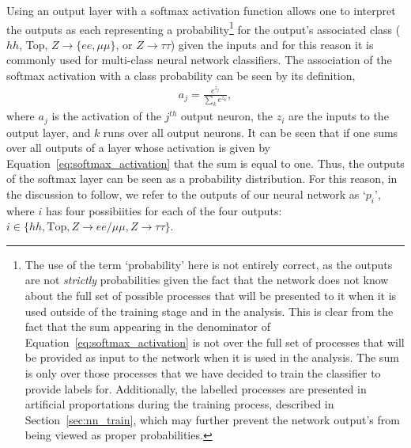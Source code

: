 Using an output layer with a softmax activation function allows one to interpret the outputs as
each representing a probability\footnote{
The use of the term `probability' here is not entirely correct, as the outputs are not \textit{strictly} probabilities given the fact that the network
does not know about the full set of possible processes that will be presented to it when it is used outside
of the training stage and in the analysis.
This is clear from the fact that the sum appearing in the denominator of Equation~\ref{eq:softmax_activation}
is not over the full set of processes that will be provided as input to the network when it is used
in the analysis.
The sum is only over those processes that we have decided to train the classifier to provide labels for.
Additionally, the labelled
processes are presented in artificial proportations during the training process, described in Section~\ref{sec:nn_train},
which may further prevent the network output's from being viewed as proper probabilities.
}
for the output's associated class ($hh$, Top, $Z \rightarrow \{ee,\mu\mu\}$,
or $Z \rightarrow \tau\tau$) given the inputs and for this reason it is commonly used for multi-class
neural network classifiers.
The association of the softmax activation with a class probability can be seen by its definition,
\begin{align}
    a_j = \frac{ e^{z_j} } { \sum\limits_k e ^{z_k} },
    \label{eq:softmax_activation}
\end{align}
where $a_j$ is the activation of the $j^{th}$ output neuron, the $z_i$ are the inputs to the output layer,
and $k$ runs over all output neurons.
It can be seen that if one sums over all outputs of a layer whose activation is given by Equation~\ref{eq:softmax_activation}
that the sum is equal to one.
Thus, the outputs of the softmax layer can be seen as a probability distribution.
For this reason, in the discussion to follow, we refer to the outputs of our neural network as `$p_i$',
where $i$ has four possibiities for each of the four outputs: $i \in \{ hh, \text{Top}, Z\rightarrow ee/\mu\mu, Z\rightarrow \tau\tau \}$.

